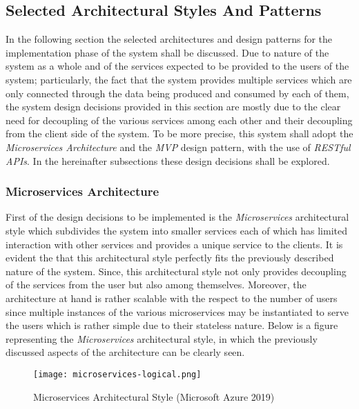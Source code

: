 \subsection{Selected Architectural Styles And Patterns}
In the following section the selected architectures and design patterns for the implementation phase of the system shall be discussed. Due to nature of the system as a whole and of the services expected to be provided to the users of the system; particularly, the fact that the system provides multiple services which are only connected through the data being produced and consumed by each of them, the system design decisions provided in this section are mostly due to the clear need for decoupling of the various services among each other and their decoupling from the client side of the system. To be more precise, this system shall adopt the \emph{Microservices Architecture} and the \emph{MVP} design pattern, with the use of \emph{RESTful APIs}. In the hereinafter subsections these design decisions shall be explored.

\subsubsection{Microservices Architecture}
First of the design decisions to be implemented is the \emph{Microservices} architectural style which subdivides the system into smaller services each of which has limited interaction with other services and provides a unique service to the clients. It is evident the that this architectural style perfectly fits the previously described nature of the system. Since, this architectural style not only provides decoupling of the services from the user but also among themselves. Moreover, the architecture at hand is rather scalable with the respect to the number of users since multiple instances of the various microservices may be instantiated to serve the users which is rather simple due to their stateless nature. Below is a figure representing the \emph{Microservices} architectural style, in which the previously discussed aspects of the architecture can be clearly seen.

\begin{figure}[H]
\caption{Microservices Architectural Style (Microsoft Azure 2019)}
\label{fig:MS-arch-style}
\centering
\texttt{[image: microservices-logical.png]}
\end{figure}

